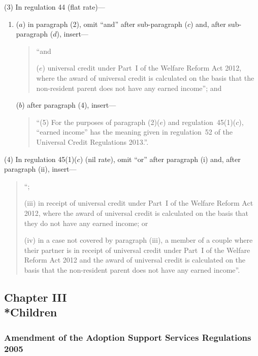 \documentclass[12pt,a4paper]{article}
\begin{document}
(3) In regulation 44 (flat rate)—
\begin{enumerate}\item[]
($a$) in paragraph (2), omit “and” after sub-paragraph ($c$)  and, after sub-paragraph ($d$), insert—
\begin{quotation}
“and

($e$) universal credit under Part~I of the Welfare Reform Act 2012, where the award of universal credit is calculated on the basis that the non-resident parent does not have any earned income”; and
\end{quotation}

($b$) after paragraph (4), insert—
\begin{quotation}
“(5) For the purposes of paragraph (2)($e$)  and regulation~45(1)($c$), “earned income” has the meaning given in regulation~52 of the Universal Credit Regulations 2013.”.
\end{quotation}
\end{enumerate}

(4) In regulation 45(1)($c$)  (nil rate), omit “or” after paragraph (i)  and, after paragraph (ii), insert—
\begin{quotation}
“;

(iii) in receipt of universal credit under Part~I of the Welfare Reform Act 2012, where the award of universal credit is calculated on the basis that they do not have any earned income; or

(iv) in a case not covered by paragraph (iii), a member of a couple where their partner is in receipt of universal credit under Part~I of the Welfare Reform Act 2012 and the award of universal credit is calculated on the basis that the non-resident parent does not have any earned income”.
\end{quotation}

\subsection[Chapter III --- Children]{Chapter III\\*Children}

\renewcommand\parthead{--- Part III Chapter III}

\subsubsection[45. Amendment of the Adoption Support Services Regulations 2005]{Amendment of the Adoption Support Services Regulations 2005}
\end{document}
